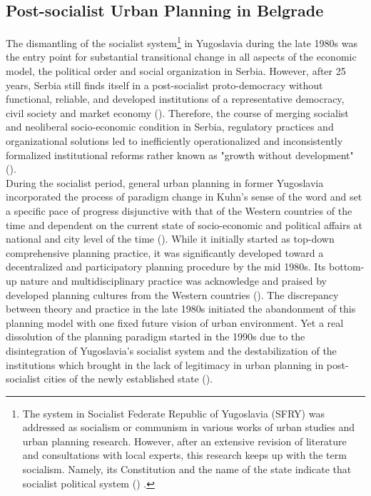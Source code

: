 \documentclass[11pt]{report}
\begin{document}
\subsection{Post-socialist Urban Planning in Belgrade}

The  dismantling  of  the  socialist system\footnote{The system in Socialist Federate Republic of Yugoslavia (SFRY) was addressed as socialism or communism in various works of urban studies and urban planning research.
However, after an extensive revision of literature and consultations with local experts, this research keeps up with the term socialism. Namely, its Constitution and the name of the state indicate that socialist political system (\citealt{ref constitution})
.}
in Yugoslavia during the late 1980s was the entry point for substantial transitional change in all aspects of the economic model, the political order and social organization in Serbia. 
However, after 25 years, Serbia still finds itself in a post-socialist proto-democracy without functional, reliable, and developed institutions of a representative 
democracy, civil society and market economy (\href{Vujosevic}{\citealt{vujosevic_postsocijalisticka_2010}}). 
Therefore, the course of merging socialist and neoliberal socio-economic condition in Serbia, regulatory practices and organizational solutions led to inefficiently operationalized and inconsistently formalized institutional reforms rather known as "growth without development" (\citealt{Vujosevic}).
\\

During the socialist period, general urban planning in former Yugoslavia incorporated the process of paradigm change in Kuhn’s sense of the word and set a specific pace of progress disjunctive with that of the Western countries of the time and dependent on the current state of socio-economic and political affairs at national and city level of the time (\citealt{Bajic-Brkovic 2002}).
While it initially started as top-down comprehensive planning practice, it was significantly developed toward a decentralized and participatory planning procedure by the mid 1980s. Its bottom-up nature and multidisciplinary practice was acknowledge and praised by developed planning cultures from the Western countries (\citealt{Cullingworth 1997}).
The discrepancy between theory and practice in the late 1980s initiated the abandonment of this planning model with one fixed future vision of urban environment.
Yet a real dissolution of the planning paradigm started in the 1990s due to the disintegration of Yugoslavia’s socialist system and the destabilization of the institutions which brought in the lack of legitimacy in urban planning in post-socialist cities of the newly established state (\citealt{Vujosevic 2010}).
\\
\end{document}
